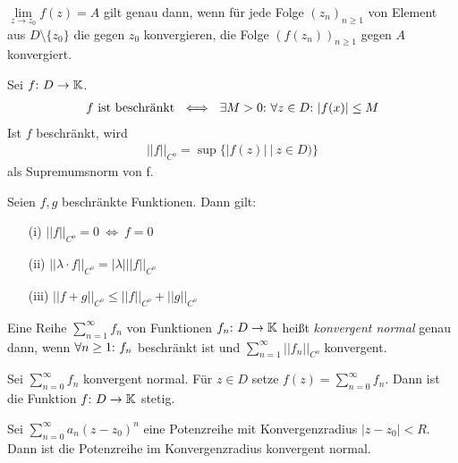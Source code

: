 \begin{framedthm}
	$\lim\limits_{z \to z_0} f(z) = A$ gilt genau dann, wenn für jede Folge $(z_n)_{n\geq 1}$ von Element aus $D\setminus\{z_0\}$ die gegen $z_0$ konvergieren, die Folge $(f(z_n))_{n\geq 1}$ gegen $A$ konvergiert.
\end{framedthm}

\begin{frameddefn}
	Sei $f{:}\  D \to \mathbb{K}$.
	\begin{align*}
		f \textrm{ ist beschränkt} \ \iff\ \exists M > 0{:}\  \forall z \in D{:}\  |f(x)| \leq M
	\end{align*}
	Ist $f$ beschränkt, wird
	\begin{align*}
		||f||_{C^o} = \sup\{|f(z)|\ \big|\ z \in D)\}
	\end{align*}
	als Supremumsnorm von f.
\end{frameddefn}

\begin{framedthm}
	Seien $f,g$ beschränkte Funktionen. Dann gilt:
	\begin{enumerate}
		\item[(i)] $||f||_{C^o} = 0 \ \iff\ f = 0$
		\item[(ii)] $||\lambda\cdot f||_{C^o} = |\lambda|||f||_{C^o}$
		\item[(iii)] $||f+g||_{C^o} \leq ||f||_{C^o} + ||g||_{C^o}$
	\end{enumerate}
\end{framedthm}

\begin{frameddefn}
	Eine Reihe $\sum_{n=1}^{\infty} f_n$ von Funktionen $f_n{:}\  D \to \mathbb{K}$ heißt \textit{konvergent normal} genau dann, wenn $\forall n \geq 1{:}\  f_n$ beschränkt ist und $\sum_{n=1}^{\infty}||f_n||_{C^o}$ konvergent.
\end{frameddefn}

\begin{framedthm}
	Sei $\sum_{n=0}^{\infty}f_n$ konvergent normal. Für $z \in D$ setze $f(z) = \sum_{n=0}^{\infty}f_n$. Dann ist die Funktion $f{:}\  D \to \mathbb{K}$ stetig.
\end{framedthm}

\begin{framedquest}
	Sei $\sum_{n=0}^{\infty} a_n (z-z_0)^n$ eine Potenzreihe mit Konvergenzradius $|z-z_0| < R$. Dann ist die Potenzreihe im Konvergenzradius konvergent normal.
\end{framedquest}

